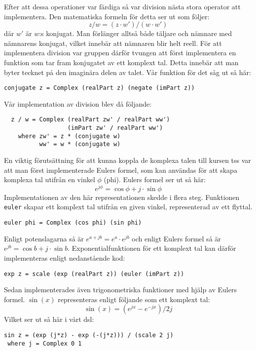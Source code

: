 \documentclass[12pt,a4paper,twoside,openright]{article}
\begin{document}
Efter att dessa operationer var färdiga så var division nästa stora
operator att implementera. Den matematiska formeln för detta ser ut
som följer:
\[ z / w = (z \cdot w') / (w \cdot w') \]
där \(w'\) är \(w\):s
konjugat. Man förlänger alltså både täljare och nämnare med nämnarens
konjugat, vilket innebär att nämnaren blir helt reell. För att
implementera division var gruppen därför tvungen att först
implementera en funktion som tar fram konjugatet av ett komplext
tal. Detta innebär att man byter tecknet på den imaginära delen av
talet. Vår funktion för det såg ut så här:

\begin{verbatim}
conjugate z = Complex (realPart z) (negate (imPart z))
\end{verbatim}
Vår implementation av division blev då följande:

\begin{verbatim}
  z / w = Complex (realPart zw' / realPart ww')
                  (imPart zw' / realPart ww')
    where zw' = z * (conjugate w)
          ww' = w * (conjugate w)
\end{verbatim}

En viktig förutsättning för att kunna koppla de komplexa talen till
kursen \gls{tss} var att man först implementerade Eulers formel, som
kan användas för att skapa komplexa tal utifrån en vinkel \(\phi\)
(phi). Eulers formel ser ut så här:
\[e^{j\phi}=\cos \phi+ j \cdot \sin \phi \]
Implementationen av den här representationen skedde i flera steg.
Funktionen \texttt{euler} skapar ett komplext tal utifrån
en given vinkel, representerad av ett flyttal.
\begin{verbatim}
euler phi = Complex (cos phi) (sin phi)
\end{verbatim}
Enligt potenslagarna så är \(e^{a+jb} = e^{a} \cdot e^{jb}\) och
enligt Eulers formel så är \(e^{j b} = \cos b + j\cdot \sin b\).
Exponentialfunktionen för ett komplext tal kan därför implementeras
enligt nedanstående kod:
\begin{verbatim}
exp z = scale (exp (realPart z)) (euler (imPart z))
\end{verbatim}
Sedan implementerades även trigonometriska funktioner med hjälp av
Eulers formel. \(\sin(x)\) representeras enligt följande som ett komplext
tal:
\[ \sin(x) = (e^{j x} - e^{-j x}) / 2 j \]
Vilket ser ut så här i vårt \gls{dsl}:
\begin{verbatim}
sin z = (exp (j*z) - exp (-(j*z))) / (scale 2 j)
 where j = Complex 0 1
\end{verbatim}
\end{document}
